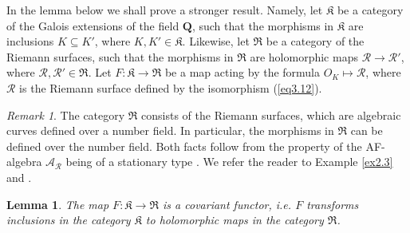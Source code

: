 \documentclass[10pt, reqno]{amsart}
\newtheorem{lemma}[theorem]{Lemma}
\theoremstyle{definition}
\theoremstyle{remark}
\newtheorem{remark}[theorem]{Remark}
\numberwithin{equation}{section}
\begin{document}
In the lemma below we shall prove a stronger result. 
Namely, let $\mathfrak{K}$ be a category of the Galois extensions of the field $\mathbf{Q}$,
such that the  morphisms in $\mathfrak{K}$ are inclusions $K\subseteq K'$, where $K,K'\in\mathfrak{K}$.  
 Likewise, let $\mathfrak{R}$ be a category of the Riemann surfaces,
such that the  morphisms in $\mathfrak{R}$ are holomorphic maps $\mathscr{R}\to \mathscr{R}'$, 
where $\mathscr{R}, \mathscr{R}'\in\mathfrak{R}$.  
Let $F: \mathfrak{K}\to\mathfrak{R}$ be a map acting by the formula $O_K\mapsto\mathscr{R}$,  where
$\mathscr{R}$ is the Riemann surface defined by the isomorphism (\ref{eq3.12}).  
\begin{remark}\label{rmk3.1}
The category $\mathfrak{R}$ consists of the Riemann surfaces, which are algebraic curves defined over a number field.
In particular,  the morphisms in  $\mathfrak{R}$ can be  defined over the number field.  Both facts follow from  
the property of the AF-algebra $\mathscr{A}_{\mathscr{R}}$ being of a stationary type  \cite[Section 5.2]{N}. 
We refer the reader to Example \ref{ex2.3} and \cite[Lemma 3.1]{Nik2}. 
\end{remark}
\begin{lemma}\label{lm3.1}
The map $F: \mathfrak{K}\to\mathfrak{R}$ is  a covariant functor, i.e. $F$  transforms  inclusions 
in the category $\mathfrak{K}$  to  holomorphic maps in the category $\mathfrak{R}$. 
\end{lemma}
\end{document}
